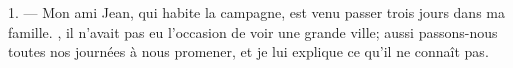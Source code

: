 %
%
%
%
%
%

\VUsaut{4.0mm}
\VUsaut{3.0mm}

\VUsaut{3.0mm}

1. --- Mon ami Jean, qui habite la campagne, est venu passer trois jours dans ma
famille. , il n'avait pas eu l'occasion de voir une grande
ville; aussi passons-nous toutes nos journées à nous promener, et je lui
explique ce qu'il ne connaît pas.

